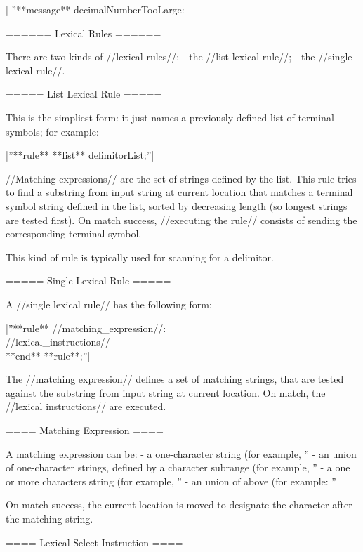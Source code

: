 |  ''**message** decimalNumberTooLarge: %

 

====== Lexical Rules ======

There are two kinds of //lexical rules//:
  - the //list lexical rule//;
  - the //single lexical rule//.

===== List Lexical Rule =====

This is the simpliest form: it just names a previously defined list of terminal symbols; for example:

|''**rule** **list** delimitorList;''|

//Matching expressions// are the set of strings defined by the list. This rule tries to find a substring from input string at current location that matches a terminal symbol string defined in the list, sorted by decreasing length (so longest strings are tested first). On match success, //executing the rule// consists of sending the corresponding terminal symbol.

This kind of rule is typically used for scanning for a delimitor.

===== Single Lexical Rule =====

A //single lexical rule// has the following form:

|''**rule** //matching\_expression//:\\  //lexical\_instructions//\\ **end** **rule**;''|

The //matching expression// defines a set of matching strings, that are tested against the substring from input string at current location. On match, the //lexical instructions// are executed.

==== Matching Expression ====

A matching expression can be:
  - a one-character string (for example, ''%
  - an union of one-character strings, defined by a character subrange (for example, ''%
  - a one or more characters string (for example, ''%
  - an union of above (for example: ''%

On match success, the current location is moved to designate the character after the matching string.

==== Lexical Select Instruction ====

